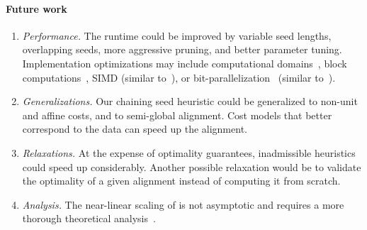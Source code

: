 \paragraph{Future work} \phantom{x}
\nopagebreaklist

\begin{enumerate}
    \item \emph{Performance.} The runtime could be improved by variable seed
        lengths, overlapping seeds, more aggressive pruning, and better
        parameter tuning. Implementation optimizations may include computational
        domains~\citep{spouge1989speeding}, block
        computations~\citep{liu21block}, SIMD (similar to~\wfa), or
        bit-parallelization~\citep{myers1999fast} (similar to~\edlib).
    \item \emph{Generalizations.} Our chaining seed heuristic could be
        generalized to non-unit and affine costs, and to semi-global alignment.
        Cost models that better correspond to the data can speed up the
        alignment.
    \item \emph{Relaxations.} At the expense of optimality guarantees,
        inadmissible heuristics could speed up \A considerably. Another possible
        relaxation would be to validate the optimality of a given alignment
        instead of computing it from scratch.
    \item \emph{Analysis.} The near-linear scaling of \A is not asymptotic and
        requires a more thorough theoretical
        analysis~\citep{medvedev2022limitations}.
\end{enumerate}
